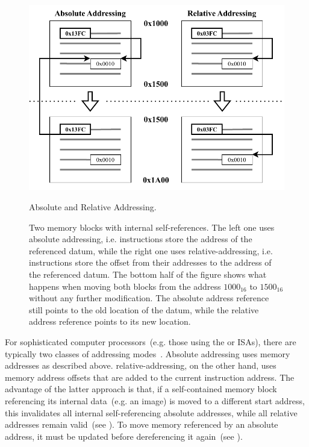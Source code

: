 \begin{figure}[htb]
  \centering
  \includegraphics{Figures/Addressing.pdf}
  \caption{Absolute and Relative Addressing.}
  \label{fig:rel_addr}
  \caption*{Two memory blocks with internal self-references. The left one uses absolute addressing, i.e. instructions store the address of the referenced datum, while the right one uses \gls{relative-addressing}, i.e. instructions store the offset from their addresses to the address of the referenced datum. The bottom half of the figure shows what happens when moving both blocks from the address $\mathrm{1000}_{16}$ to $\mathrm{1500}_{16}$ without any further modification. The absolute address reference still points to the old location of the datum, while the relative address reference points to its new location.}
\end{figure}

For sophisticated computer processors~(e.g. those using the  or  \glspl{ISA}), there are typically two classes of addressing modes~\cite{ia32,arm-isa}. Absolute addressing uses memory addresses as described above. \Gls{relative-addressing}, on the other hand, uses memory address offsets that are added to the current instruction address. The advantage of the latter approach is that, if a self-contained memory block referencing its internal data~(e.g. an \gls{image}) is moved to a different start address, this invalidates all internal self-referencing absolute addresses, while all relative addresses remain valid~(see ). To move memory referenced by an absolute address, it must be updated before dereferencing it again~(see ).

